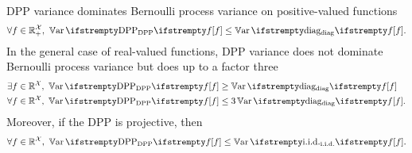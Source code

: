 \begin{tcolorbox}
	\begin{proposition}\ \\
		\label{prop__var_comp}
		DPP variance dominates Bernoulli process variance on positive-valued functions
		\begin{align}
			\label{eqn__posvar}
			\forall \query \in \RR_+^{\mathcal{X}},\ \Var{\textrm{DPP}}{f} \leq \Var{\textrm{diag}}{f}.
		\end{align}
		In the general case of real-valued functions, DPP variance does not dominate Bernoulli process variance but does up to a factor three
		\begin{align}
			\label{eqn__nodom}
			&\exists \query \in \RR^{\mathcal{X}},\ \Var{\textrm{DPP}}{f} \geq \Var{\textrm{diag}}{f}\\
			\label{eqn__domtwo}
			&\forall \query \in \RR^{\mathcal{X}},\ \Var{\textrm{DPP}}{f} \leq 3\Var{\textrm{diag}}{f}.
		\end{align}
		Moreover, if the DPP is projective, then
		\begin{align}
			\label{eqn__projiid}
			\forall \query \in \RR^{\mathcal{X}},\ \Var{\textrm{DPP}}{f} \leq \Var{\textrm{i.i.d.}}{f}.
		\end{align}
	\end{proposition}
\end{tcolorbox}



